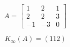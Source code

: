\[
A=\left[
\begin{array}{ccc}
1 & 2 & 1 \\
2 & 2 & 3\\
-1 & -3 & 0
\end{array}\right]
\]
\bigskip

\[
  K_\infty (A)= \left(
  112 \right)
\]
